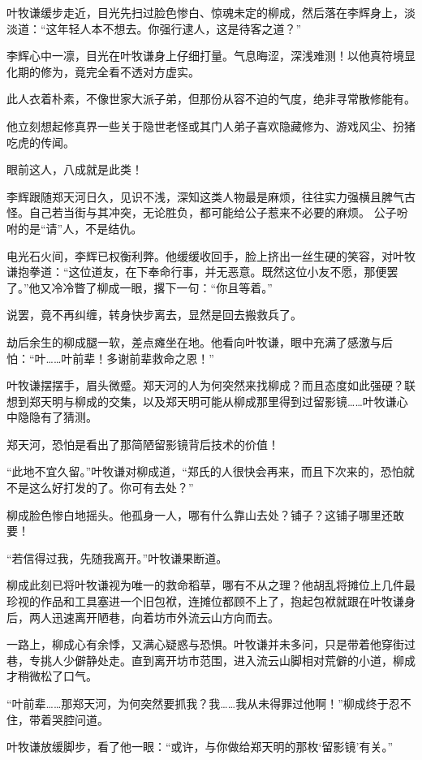 叶牧谦缓步走近，目光先扫过脸色惨白、惊魂未定的柳成，然后落在李辉身上，淡淡道：“这年轻人本不想去。你强行逮人，这是待客之道？”

李辉心中一凛，目光在叶牧谦身上仔细打量。气息晦涩，深浅难测！以他真符境显化期的修为，竟完全看不透对方虚实。

此人衣着朴素，不像世家大派子弟，但那份从容不迫的气度，绝非寻常散修能有。

他立刻想起修真界一些关于隐世老怪或其门人弟子喜欢隐藏修为、游戏风尘、扮猪吃虎的传闻。

眼前这人，八成就是此类！

李辉跟随郑天河日久，见识不浅，深知这类人物最是麻烦，往往实力强横且脾气古怪。自己若当街与其冲突，无论胜负，都可能给公子惹来不必要的麻烦。 公子吩咐的是“请”人，不是结仇。

电光石火间，李辉已权衡利弊。他缓缓收回手，脸上挤出一丝生硬的笑容，对叶牧谦抱拳道：“这位道友，在下奉命行事，并无恶意。既然这位小友不愿，那便罢了。”他又冷冷瞥了柳成一眼，撂下一句：“你且等着。”

说罢，竟不再纠缠，转身快步离去，显然是回去搬救兵了。

\vspace{2em}

劫后余生的柳成腿一软，差点瘫坐在地。他看向叶牧谦，眼中充满了感激与后怕：“叶……叶前辈！多谢前辈救命之恩！”

叶牧谦摆摆手，眉头微蹙。郑天河的人为何突然来找柳成？而且态度如此强硬？联想到郑天明与柳成的交集，以及郑天明可能从柳成那里得到过留影镜……叶牧谦心中隐隐有了猜测。

郑天河，恐怕是看出了那简陋留影镜背后技术的价值！

“此地不宜久留。”叶牧谦对柳成道，“郑氏的人很快会再来，而且下次来的，恐怕就不是这么好打发的了。你可有去处？”

柳成脸色惨白地摇头。他孤身一人，哪有什么靠山去处？铺子？这铺子哪里还敢要！

“若信得过我，先随我离开。”叶牧谦果断道。

柳成此刻已将叶牧谦视为唯一的救命稻草，哪有不从之理？他胡乱将摊位上几件最珍视的作品和工具塞进一个旧包袱，连摊位都顾不上了，抱起包袱就跟在叶牧谦身后，两人迅速离开陋巷，向着坊市外流云山方向而去。

一路上，柳成心有余悸，又满心疑惑与恐惧。叶牧谦并未多问，只是带着他穿街过巷，专挑人少僻静处走。直到离开坊市范围，进入流云山脚相对荒僻的小道，柳成才稍微松了口气。

“叶前辈……那郑天河，为何突然要抓我？我……我从未得罪过他啊！”柳成终于忍不住，带着哭腔问道。

叶牧谦放缓脚步，看了他一眼：“或许，与你做给郑天明的那枚‘留影镜’有关。”


